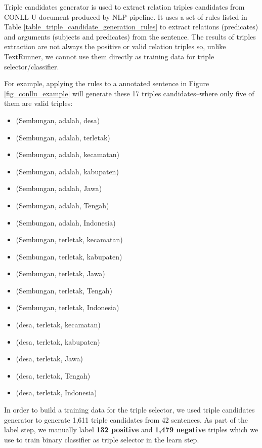 \documentclass[peerreview,12pt]{IEEEtran}
\begin{document}

Triple candidates generator is used to extract relation triples candidates from CONLL-U document produced by NLP pipeline. It uses a set of rules listed in Table \ref{table_triple_candidate_generation_rules} to extract relations (predicates) and arguments (subjects and predicates) from the sentence. The results of triples extraction are not always the positive or valid relation triples so, unlike TextRunner\cite{banko2007open}, we cannot use them directly as training data for triple selector/classifier.

For example, applying the rules to a annotated sentence in Figure \ref{fig_conllu_example} will generate these 17 triples candidates--where only five of them are valid triples:

\begin{itemize}
\item (Sembungan, adalah, desa) 
\item (Sembungan, adalah, terletak)
\item (Sembungan, adalah, kecamatan)
\item (Sembungan, adalah, kabupaten)
\item (Sembungan, adalah, Jawa)
\item (Sembungan, adalah, Tengah)
\item (Sembungan, adalah, Indonesia)
\item (Sembungan, terletak, kecamatan) 
\item (Sembungan, terletak, kabupaten) 
\item (Sembungan, terletak, Jawa) 
\item (Sembungan, terletak, Tengah)
\item (Sembungan, terletak, Indonesia) 
\item (desa, terletak, kecamatan)
\item (desa, terletak, kabupaten)
\item (desa, terletak, Jawa)
\item (desa, terletak, Tengah)
\item (desa, terletak, Indonesia)
\end{itemize}

In order to build a training data for the triple selector, we used triple candidates generator to generate 1,611 triple candidates from 42 sentences. As part of the label step, we manually label \textbf{132 positive} and \textbf{1,479 negative} triples which we use to train binary classifier as triple selector in the learn step.
\end{document}
